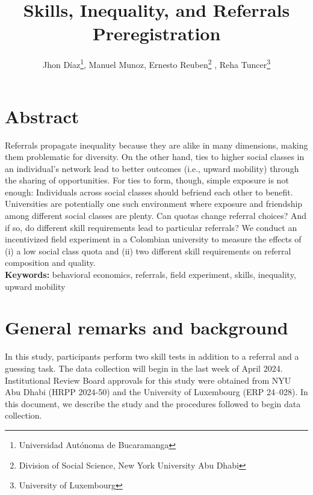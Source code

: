 \documentclass[11pt,a4paper,oneside]{article}
\title{Skills, Inequality, and Referrals \\ \large Preregistration \\}
\author{Jhon Díaz\footnote{Universidad Autónoma de Bucaramanga}, Manuel Munoz\footremember{liser}{Luxembourg Institute of Socio-Economic Research}, Ernesto Reuben\footnote{Division of Social Science, New York University Abu Dhabi} \footrecall{liser}, Reha Tuncer\footnote{University of Luxembourg}}
\begin{document}
\maketitle



\section*{Abstract}

Referrals propagate inequality because they are alike in many dimensions, making them problematic for diversity. On the other hand, ties to higher social classes in an individual's network lead to better outcomes (i.e., upward mobility) through the sharing of opportunities. For ties to form, though, simple exposure is not enough: Individuals across social classes should befriend each other to benefit. Universities are potentially one such environment where exposure and friendship among different social classes are plenty. Can quotas change referral choices? And if so, do different skill requirements lead to particular referrals? We conduct an incentivized field experiment in a Colombian university to measure the effects of (i) a low social class quota and (ii) two different skill requirements on referral composition and quality. \medskip \\
\textbf{Keywords:} behavioral economics, referrals, field experiment, skills, inequality, upward mobility


\section{General remarks and background}

In this study, participants perform two skill tests in addition to a referral and a guessing task. The data collection will begin in the last week of April 2024. Institutional Review Board approvals for this study were obtained from NYU Abu Dhabi (HRPP 2024-50) and the University of Luxembourg (ERP 24–028). In this document, we describe the study and the procedures followed to begin data collection.
\end{document}
